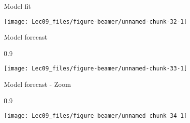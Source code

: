 \documentclass[11pt,ignorenonframetext,]{beamer}
\newenvironment{Shaded}{}{}
\newcommand{\DataTypeTok}[1]{\textcolor[rgb]{0.56,0.13,0.00}{#1}}
\newcommand{\DecValTok}[1]{\textcolor[rgb]{0.25,0.63,0.44}{#1}}
\newcommand{\KeywordTok}[1]{\textcolor[rgb]{0.00,0.44,0.13}{\textbf{#1}}}
\newcommand{\NormalTok}[1]{#1}
\newcommand{\OperatorTok}[1]{\textcolor[rgb]{0.40,0.40,0.40}{#1}}
\newcommand{\StringTok}[1]{\textcolor[rgb]{0.25,0.44,0.63}{#1}}
\let\oldShaded\Shaded
\let\endoldShaded\endShaded
\renewenvironment{Shaded}{\footnotesize\begin{spacing}{0.9}\oldShaded}{\endoldShaded\end{spacing}}
\begin{document}
\begin{frame}{Model fit}
\protect\hypertarget{model-fit}{}

\begin{center}\texttt{[image: Lec09\_files/figure-beamer/unnamed-chunk-32-1]} \end{center}

\end{frame}

\begin{frame}[fragile]{Model forecast}
\protect\hypertarget{model-forecast}{}

\begin{Shaded}
\end{Shaded}

\begin{center}\texttt{[image: Lec09\_files/figure-beamer/unnamed-chunk-33-1]} \end{center}

\end{frame}

\begin{frame}[fragile]{Model forecast - Zoom}
\protect\hypertarget{model-forecast---zoom}{}

\begin{Shaded}
\end{Shaded}

\begin{center}\texttt{[image: Lec09\_files/figure-beamer/unnamed-chunk-34-1]} \end{center}

\end{frame}
\end{document}
